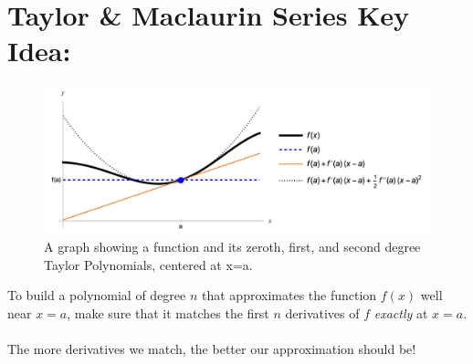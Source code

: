 
\setlength{\columnseprule}{.4pt}
\setlength{\columnsep}{3em}

\section*{Taylor \& Maclaurin Series Key Idea:}

\begin{figure}[!h]
\includegraphics[width=1.05\textwidth]{Ch8s7-Taylor2.png}
\caption{A graph showing a function and its zeroth, first, and second degree Taylor Polynomials, centered at x=a.}
\end{figure}
To build a polynomial of degree \(n\) that approximates the function \(f(x)\) well near \(x=a\), make sure that it matches the first \(n\) derivatives of \(f\) \textit{exactly} at \(x=a\).\\~\\
 The more derivatives we match, the better our approximation should be!\\~\\


